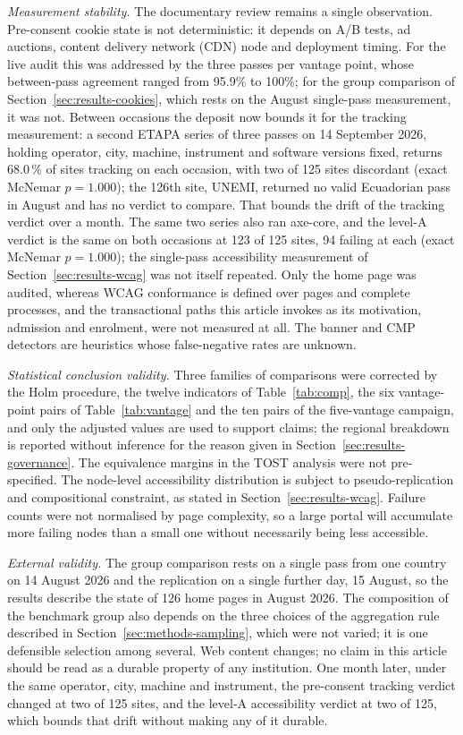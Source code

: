 \documentclass[]{interact}
\begin{document}
\emph{Measurement stability.} The documentary review remains a single observation. Pre-consent cookie state is not deterministic: it depends on A/B tests, ad auctions, content delivery network (CDN) node and deployment timing. For the live audit this was addressed by the three passes per vantage point, whose between-pass agreement ranged from 95.9\% to 100\%; for the group comparison of Section~\ref{sec:results-cookies}, which rests on the August single-pass measurement, it was not. Between occasions the deposit now bounds it for the tracking measurement: a second ETAPA series of three passes on 14 September 2026, holding operator, city, machine, instrument and software versions fixed, returns 68.0\,\% of sites tracking on each occasion, with two of 125 sites discordant (exact McNemar $p=1.000$); the 126th site, UNEMI, returned no valid Ecuadorian pass in August and has no verdict to compare. That bounds the drift of the tracking verdict over a month. The same two series also ran axe-core, and the level-A verdict is the same on both occasions at 123 of 125 sites, 94 failing at each (exact McNemar $p=1.000$); the single-pass accessibility measurement of Section~\ref{sec:results-wcag} was not itself repeated. Only the home page was audited, whereas WCAG conformance is defined over pages and complete processes, and the transactional paths this article invokes as its motivation, admission and enrolment, were not measured at all. The banner and CMP detectors are heuristics whose false-negative rates are unknown.

\emph{Statistical conclusion validity.} Three families of comparisons were corrected by the Holm procedure, the twelve indicators of Table~\ref{tab:comp}, the six vantage-point pairs of Table~\ref{tab:vantage} and the ten pairs of the five-vantage campaign, and only the adjusted values are used to support claims; the regional breakdown is reported without inference for the reason given in Section~\ref{sec:results-governance}. The equivalence margins in the TOST analysis were not pre-specified. The node-level accessibility distribution is subject to pseudo-replication and compositional constraint, as stated in Section~\ref{sec:results-wcag}. Failure counts were not normalised by page complexity, so a large portal will accumulate more failing nodes than a small one without necessarily being less accessible.

\emph{External validity.} The group comparison rests on a single pass from one country on 14 August 2026 and the replication on a single further day, 15 August, so the results describe the state of 126 home pages in August 2026. The composition of the benchmark group also depends on the three choices of the aggregation rule described in Section~\ref{sec:methods-sampling}, which were not varied; it is one defensible selection among several. Web content changes; no claim in this article should be read as a durable property of any institution. One month later, under the same operator, city, machine and instrument, the pre-consent tracking verdict changed at two of 125 sites, and the level-A accessibility verdict at two of 125, which bounds that drift without making any of it durable.
\end{document}

